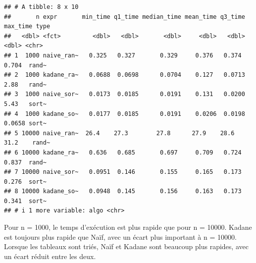 \documentclass[
]{article}
\begin{document}
\begin{verbatim}
## # A tibble: 8 x 10
##       n expr       min_time q1_time median_time mean_time q3_time max_time type 
##   <dbl> <fct>         <dbl>   <dbl>       <dbl>     <dbl>   <dbl>    <dbl> <chr>
## 1  1000 naive_ran~   0.325   0.327       0.329     0.376   0.374    0.704  rand~
## 2  1000 kadane_ra~   0.0688  0.0698      0.0704    0.127   0.0713   2.88   rand~
## 3  1000 naive_sor~   0.0173  0.0185      0.0191    0.131   0.0200   5.43   sort~
## 4  1000 kadane_so~   0.0177  0.0185      0.0191    0.0206  0.0198   0.0658 sort~
## 5 10000 naive_ran~  26.4    27.3        27.8      27.9    28.6     31.2    rand~
## 6 10000 kadane_ra~   0.636   0.685       0.697     0.709   0.724    0.837  rand~
## 7 10000 naive_sor~   0.0951  0.146       0.155     0.165   0.173    0.276  sort~
## 8 10000 kadane_so~   0.0948  0.145       0.156     0.163   0.173    0.341  sort~
## # i 1 more variable: algo <chr>
\end{verbatim}

Pour n = 1000, le temps d'exécution est plus rapide que pour n = 10000.
Kadane est toujours plus rapide que Naïf, avec un écart plus important à
n = 10000. Lorsque les tableaux sont triés, Naïf et Kadane sont beaucoup
plus rapides, avec un écart réduit entre les deux.
\end{document}
